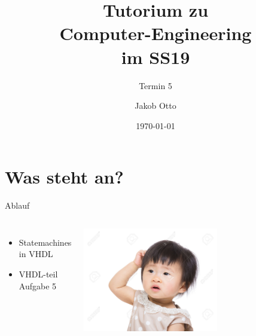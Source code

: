 \documentclass[aspectratio=169,presentation]{beamer}
\date{\today}
\newcommand{\terminNummer}{5}
\begin{document}
\title[CE Tutorium]{Tutorium zu\\Computer-Engineering\\im SS19}
\subtitle{Termin \terminNummer}
\author[Otto]{Jakob Otto}
\subject{CE Tutorium}

\titlepage

\section{Was steht an?}
\begin{frame}{Ablauf}
	\begin{columns}
    \begin{itemize}
      \item Statemachines in VHDL
      \item VHDL-teil Aufgabe 5
		\end{itemize}
		\includegraphics[width=0.6\textwidth]{kratzen}
	\end{columns}
\end{frame}

\end{document}
